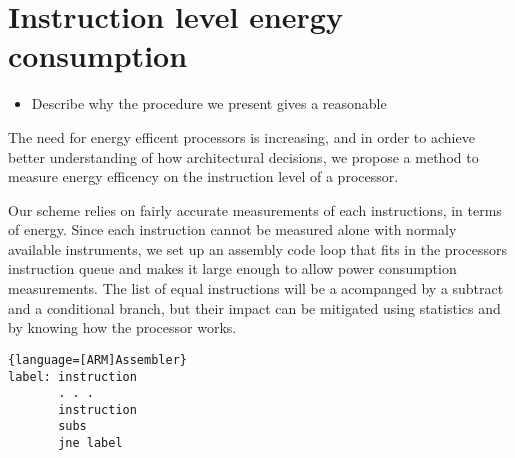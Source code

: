 \section{Instruction level energy consumption}

\begin{itemize}
    \item Describe why the procedure we present gives a reasonable
\end{itemize}


The need for energy efficent processors is increasing, and in order to achieve
better understanding of how architectural decisions, we propose a method to
measure energy efficency on the instruction level of a processor.

Our scheme relies on fairly accurate measurements of each instructions, in terms
of energy. Since each instruction cannot be measured alone with normaly
available instruments, we set up an assembly code loop that fits in the
processors instruction queue and makes it large enough to allow power
consumption measurements. The list of equal instructions will be a acompanged by
a subtract and a conditional branch, but their impact can be mitigated using
statistics and by knowing how the processor works.

\begin{lstlisting}{language=[ARM]Assembler}
label: instruction
       . . .
       instruction
       subs
       jne label
\end{lstlisting}

